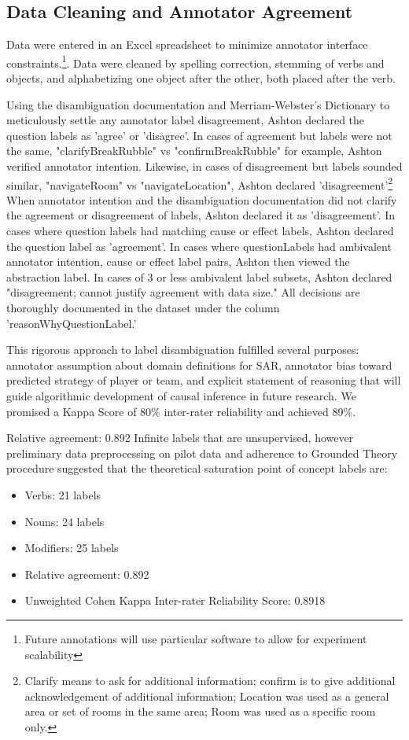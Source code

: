 \documentclass[10pt]{article}
\begin{document}
\subsection{Data Cleaning and Annotator Agreement}
Data were entered in an Excel spreadsheet to minimize annotator interface constraints.\footnote{Future annotations will use particular software to allow for experiment scalability}. Data were cleaned by spelling correction, stemming of verbs and objects, and alphabetizing one object after the other, both placed after the verb. 

Using the disambiguation documentation and Merriam-Webster's Dictionary to meticulously settle any annotator label disagreement, Ashton declared the question labels as 'agree' or 'disagree'. In cases of agreement but labels were not the same, "clarifyBreakRubble" vs "confirmBreakRubble" for example, Ashton verified annotator intention. Likewise, in cases of disagreement but labels sounded similar, "navigateRoom" vs "navigateLocation", Ashton declared 'disagreement'\footnote{Clarify means to ask for additional information; confirm is to give additional acknowledgement of additional information; Location was used as a general area or set of rooms in the same area; Room was used as a specific room only.} When annotator intention and the disambiguation documentation did not clarify the agreement or disagreement of labels, Ashton declared it as 'disagreement'. In cases where question labels had matching cause or effect labels, Ashton declared the question label as 'agreement'. In cases where questionLabels had ambivalent annotator intention, cause or effect label pairs, Ashton then viewed the abstraction label. In cases of 3 or less ambivalent label subsets, Ashton declared "disagreement; cannot justify agreement with data size." All decisions are thoroughly documented in the dataset under the column 'reasonWhyQuestionLabel.' 

This rigorous approach to label disambiguation fulfilled several purposes: annotator assumption about domain definitions for SAR, annotator bias toward predicted strategy of player or team, and explicit statement of reasoning that will guide algorithmic development of causal inference in future research. We promised a Kappa Score of 80\% inter-rater reliability and achieved 89\%. 


Relative agreement: 0.892
Infinite labels that are unsupervised, however preliminary data preprocessing on pilot data and adherence to Grounded Theory procedure suggested that the theoretical saturation point of concept labels are:
\begin{itemize}
    \item Verbs: 21 labels
    \item Nouns: 24 labels
    \item Modifiers: 25 labels
    \item Relative agreement: 0.892
    \item Unweighted Cohen Kappa Inter-rater Reliability Score: 0.8918
\end{itemize}
\end{document}
